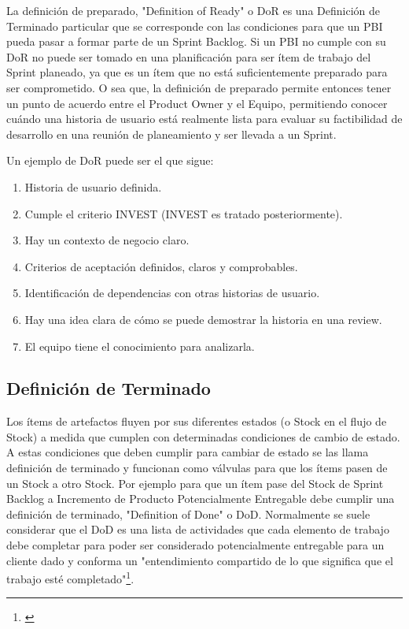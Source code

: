 La definición de preparado, "Definition of Ready" o DoR es una Definición de Terminado particular que se corresponde con las condiciones para que un PBI pueda pasar a formar parte de un Sprint Backlog. Si un PBI no cumple con su DoR no puede ser tomado en una planificación para ser ítem de trabajo del Sprint planeado, ya que es un ítem que no está suficientemente preparado para ser comprometido. O sea que, la definición de preparado permite entonces tener un punto de acuerdo entre el Product Owner y el Equipo, permitiendo conocer cuándo una historia de usuario está realmente lista para evaluar su factibilidad de desarrollo en una reunión de planeamiento y ser llevada a un Sprint.

Un ejemplo de DoR puede ser el que sigue:

\begin{enumerate}
\item{Historia de usuario definida.}
\item{Cumple el criterio INVEST (INVEST es tratado posteriormente).}
\item{Hay un contexto de negocio claro.}
\item{Criterios de aceptación definidos, claros y comprobables.}
\item{Identificación de dependencias con otras historias de usuario.}
\item{Hay una idea clara de cómo se puede demostrar la historia en una review.}
\item{El equipo tiene el conocimiento para analizarla.}
\end{enumerate}

\subsection{Definición de Terminado}

Los ítems de artefactos fluyen por sus diferentes estados (o Stock en el flujo de Stock) a medida que cumplen con determinadas condiciones de cambio de estado. A estas condiciones que deben cumplir para cambiar de estado se las llama definición de terminado y funcionan como válvulas para que los ítems pasen de un Stock a otro Stock. Por ejemplo para que un ítem pase del Stock de Sprint Backlog a Incremento de Producto Potencialmente Entregable debe cumplir una definición de terminado, "Definition of Done" o DoD. Normalmente se suele considerar que el DoD es una lista de actividades que cada elemento de trabajo debe completar para poder ser considerado potencialmente entregable para un cliente dado y conforma un "entendimiento compartido de lo que significa que el trabajo esté completado"\footnote{\cite{Ken-Jeff-2013}}.

